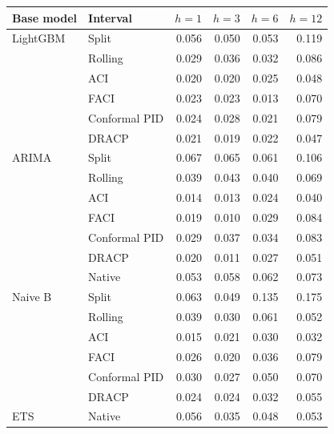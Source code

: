 \begin{tabular}{llrrrr}
\toprule
Base model & Interval & $h{=}1$ & $h{=}3$ & $h{=}6$ & $h{=}12$ \\
\midrule
LightGBM & Split & 0.056 & 0.050 & 0.053 & 0.119 \\
 & Rolling & 0.029 & 0.036 & 0.032 & 0.086 \\
 & ACI & 0.020 & 0.020 & 0.025 & 0.048 \\
 & FACI & 0.023 & 0.023 & 0.013 & 0.070 \\
 & Conformal PID & 0.024 & 0.028 & 0.021 & 0.079 \\
 & DRACP & 0.021 & 0.019 & 0.022 & 0.047 \\
\midrule
ARIMA & Split & 0.067 & 0.065 & 0.061 & 0.106 \\
 & Rolling & 0.039 & 0.043 & 0.040 & 0.069 \\
 & ACI & 0.014 & 0.013 & 0.024 & 0.040 \\
 & FACI & 0.019 & 0.010 & 0.029 & 0.084 \\
 & Conformal PID & 0.029 & 0.037 & 0.034 & 0.083 \\
 & DRACP & 0.020 & 0.011 & 0.027 & 0.051 \\
 & Native & 0.053 & 0.058 & 0.062 & 0.073 \\
\midrule
Naive B & Split & 0.063 & 0.049 & 0.135 & 0.175 \\
 & Rolling & 0.039 & 0.030 & 0.061 & 0.052 \\
 & ACI & 0.015 & 0.021 & 0.030 & 0.032 \\
 & FACI & 0.026 & 0.020 & 0.036 & 0.079 \\
 & Conformal PID & 0.030 & 0.027 & 0.050 & 0.070 \\
 & DRACP & 0.024 & 0.024 & 0.032 & 0.055 \\
\midrule
ETS & Native & 0.056 & 0.035 & 0.048 & 0.053 \\
\bottomrule
\end{tabular}
